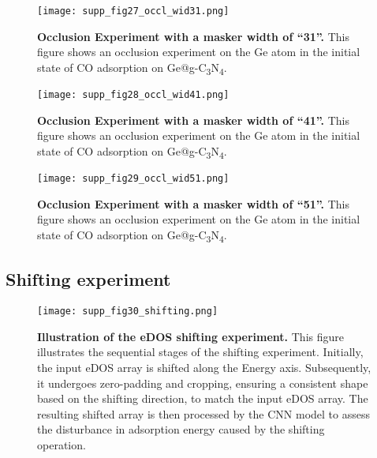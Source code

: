 \begin{figure}[htbp]
  \centering
  \texttt{[image: supp\_fig27\_occl\_wid31.png]}
  \caption{\textbf{Occlusion Experiment with a masker width of ``31''.}
  This figure shows an occlusion experiment on the Ge atom in
  the initial state of CO adsorption on Ge@g-C\textsubscript{3}N\textsubscript{4}.}
  \label{supp_fig27:occl_wid31}
\end{figure}

\begin{figure}[htbp]
  \centering
  \texttt{[image: supp\_fig28\_occl\_wid41.png]}
  \caption{\textbf{Occlusion Experiment with a masker width of ``41''.}
  This figure shows an occlusion experiment on the Ge atom in
  the initial state of CO adsorption on Ge@g-C\textsubscript{3}N\textsubscript{4}.}
  \label{supp_fig28:occl_wid41}
\end{figure}

\begin{figure}[htbp]
  \centering
  \texttt{[image: supp\_fig29\_occl\_wid51.png]}
  \caption{\textbf{Occlusion Experiment with a masker width of ``51''.}
  This figure shows an occlusion experiment on the Ge atom in
  the initial state of CO adsorption on Ge@g-C\textsubscript{3}N\textsubscript{4}.}
  \label{supp_fig29:occl_wid51}
\end{figure}

\subsection{Shifting experiment}
\label{supp_sec3.6_shifting}

\begin{figure}[htbp]
  \centering
  \texttt{[image: supp\_fig30\_shifting.png]}
  \caption{\textbf{Illustration of the eDOS shifting experiment.}
  This figure illustrates the sequential stages of the shifting experiment.
  Initially, the input eDOS array is shifted along the Energy axis.
  Subsequently, it undergoes zero-padding and cropping,
  ensuring a consistent shape based on the shifting direction, to match the input eDOS array.
  The resulting shifted array is then processed by the CNN model to
  assess the disturbance in adsorption energy caused by the shifting operation.}
  \label{supp_fig30:shifting}
\end{figure}

